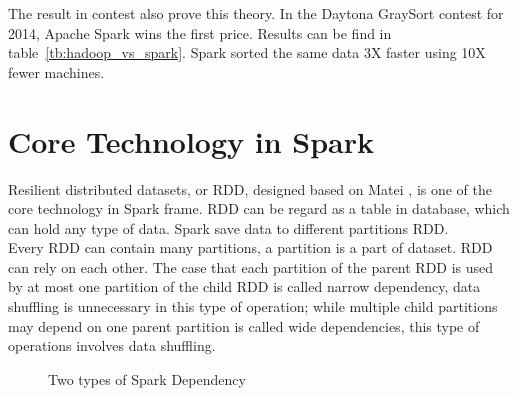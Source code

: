 The result in contest also prove this theory. In the Daytona GraySort contest for 2014, Apache Spark wins the first price\cite{3_xin_2014}. Results can be find in table~\ref{tb:hadoop_vs_spark}. Spark sorted the same data 3X faster using 10X fewer machines.
\begin{table}[h]
	\centering
	\caption{Spark TeraSort vs MapReduce\cite{3_xin_2014}}
	\label{tb:hadoop_vs_spark}
\end{table}


\section{Core Technology in Spark\cite{ryza2015advanced}}
Resilient distributed datasets, or RDD, designed based on Matei \cite{zaharia2012resilient}, is one of the core technology in Spark frame. RDD can be regard as a table in database, which can hold any type of data. Spark save data to different partitions RDD.\\


Every RDD can contain many partitions, a partition is a part of dataset. RDD can rely on each other. The case that each partition of the parent RDD is used by at most one partition of the child RDD is called narrow dependency, data shuffling is unnecessary in this type of operation; while multiple child partitions may depend on one parent partition is called wide dependencies, this type of operations involves data shuffling.
\begin{figure}[h]
	\centering
	\caption{Two types of Spark Dependency\cite{zaharia2016architecture}}
\end{figure} 

